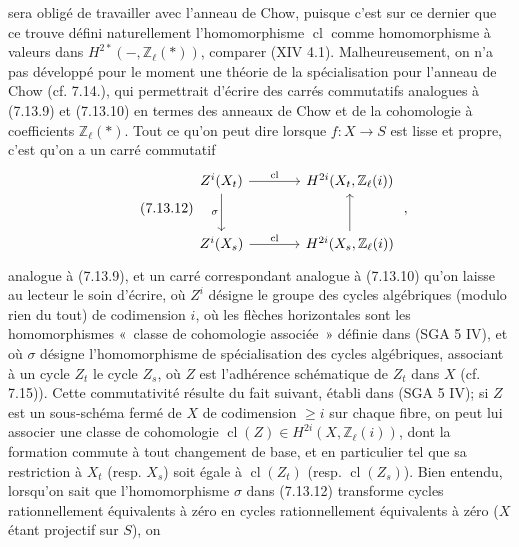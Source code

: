 sera obligé de travailler avec l'anneau de Chow, puisque c'est sur ce dernier que ce trouve défini naturellement l'homomorphisme \(\operatorname{cl}\) comme homomorphisme à valeurs dans \(H^{2*}(-,\mathbb Z_\ell(*))\), comparer (XIV 4.1). Malheureusement, on n'a pas développé pour le moment une théorie de la spécialisation pour l'anneau de Chow (cf. 7.14.), qui permettrait d'écrire des carrés commutatifs analogues à (7.13.9) et (7.13.10) en termes des anneaux de Chow et de la cohomologie à coefficients \(\mathbb Z_\ell(*)\). Tout ce qu'on peut dire lorsque \(f:X\to S\) est lisse et propre, c'est qu'on a un carré commutatif
\begin{equation}\tag{7.13.12}
\begin{tikzcd}[column sep=large,row sep=large]
Z^i(X_t) \arrow[r,"\operatorname{cl}"] \arrow[d,"\sigma"'] &
H^{2i}(X_t,\mathbb Z_\ell(i))\\
Z^i(X_s) \arrow[r,"\operatorname{cl}"] &
H^{2i}(X_s,\mathbb Z_\ell(i)) \arrow[u]
\end{tikzcd}
\;,
\end{equation}
analogue à (7.13.9), et un carré correspondant analogue à (7.13.10) qu'on laisse au lecteur le soin d'écrire, où \(Z^i\) désigne le groupe des cycles algébriques (modulo rien du tout) de codimension \(i\), où les flèches horizontales sont les homomorphismes «~classe de cohomologie associée~» définie dans (SGA 5 IV), et où \(\sigma\) désigne l'homomorphisme de spécialisation des cycles algébriques, associant à un cycle \(Z_t\) le cycle \(Z_s\), où \(Z\) est l'adhérence schématique de \(Z_t\) dans \(X\) (cf. 7.15)). Cette commutativité résulte du fait suivant, établi dans (SGA 5 IV); si \(Z\) est un sous-schéma fermé de \(X\) de codimension \(\geq i\) sur chaque fibre, on peut lui associer une classe de cohomologie \(\operatorname{cl}(Z)\in H^{2i}(X,\mathbb Z_\ell(i))\), dont la formation commute à tout changement de base, et en particulier tel que sa restriction à \(X_t\) (resp. \(X_s\)) soit égale à \(\operatorname{cl}(Z_t)\) (resp. \(\operatorname{cl}(Z_s)\)). Bien entendu, lorsqu'on sait que l'homomorphisme \(\sigma\) dans (7.13.12) transforme cycles rationnellement équivalents à zéro en cycles rationnellement équivalents à zéro (\(X\) étant projectif sur \(S\)), on
